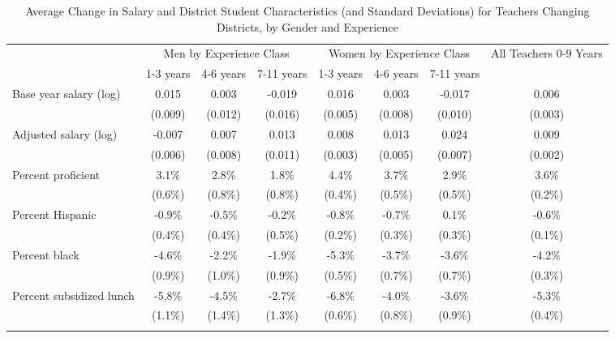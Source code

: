 \documentclass[]{article}
\begin{document}
\begin{longtable}{lccccccc}
  \hline
 & \multicolumn{3}{c}{Men by Experience Class} & \multicolumn{3}{c}{Women by Experience Class} & \multirow{2}{*}{\parbox{0.16\linewidth}{All Teachers 0-9 Years}}\\ \cline{2-4} \cline{5-7}
 & 1-3 years & 4-6 years & 7-11 years & 1-3 years & 4-6 years & 7-11 years &  \\ 
  \hline
Base year salary (log) & 0.015 & 0.003 & -0.019 & 0.016 & 0.003 & -0.017 & 0.006 \\ 
   & (0.009) & (0.012) & (0.016) & (0.005) & (0.008) & (0.010) & (0.003) \\ 
  Adjusted salary (log) & -0.007 & 0.007 & 0.013 & 0.008 & 0.013 & 0.024 & 0.009 \\ 
   & (0.006) & (0.008) & (0.011) & (0.003) & (0.005) & (0.007) & (0.002) \\ 
  Percent proficient & 3.1\% & 2.8\% & 1.8\% & 4.4\% & 3.7\% & 2.9\% & 3.6\% \\ 
   & (0.6\%) & (0.8\%) & (0.8\%) & (0.4\%) & (0.5\%) & (0.5\%) & (0.2\%) \\ 
  Percent Hispanic & -0.9\% & -0.5\% & -0.2\% & -0.8\% & -0.7\% & 0.1\% & -0.6\% \\ 
   & (0.4\%) & (0.4\%) & (0.5\%) & (0.2\%) & (0.3\%) & (0.3\%) & (0.1\%) \\ 
  Percent black & -4.6\% & -2.2\% & -1.9\% & -5.3\% & -3.7\% & -3.6\% & -4.2\% \\ 
   & (0.9\%) & (1.0\%) & (0.9\%) & (0.5\%) & (0.7\%) & (0.7\%) & (0.3\%) \\ 
  Percent subsidized lunch & -5.8\% & -4.5\% & -2.7\% & -6.8\% & -4.0\% & -3.6\% & -5.3\% \\ 
   & (1.1\%) & (1.4\%) & (1.3\%) & (0.6\%) & (0.8\%) & (0.9\%) & (0.4\%) \\ 
   \hline
\caption{Average Change in Salary and District Student Characteristics (and Standard Deviations) for Teachers Changing Districts, by Gender and Experience} 
\label{tbl:change_by_ge}
\end{longtable}
\end{document}
